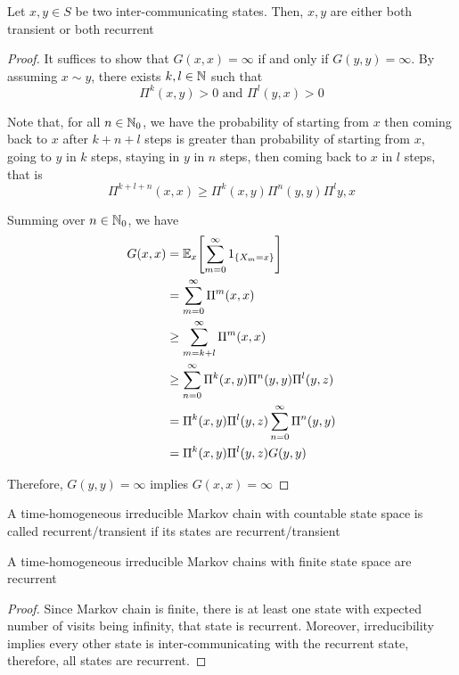 \documentclass{report}
\begin{document}
\begin{proposition}
    Let $x, y \in S$ be two inter-communicating states. Then, $x, y$ are either both transient or both recurrent
\begin{proof}
    It suffices to show that $G(x,x) = \infty$ if and only if $G(y,y) = \infty$. By assuming $x \sim y$, there exists $k, l \in \mathbb{N}$ such that
    $$
        \Pi^k(x, y) > 0 \text{ and } \Pi^l(y, x) > 0
    $$

    Note that, for all $n \in \mathbb{N}_0$, we have the probability of starting from $x$ then coming back to $x$ after $k+n+l$ steps is greater than probability of starting from $x$, going to $y$ in $k$ steps, staying in $y$ in $n$ steps, then coming back to $x$ in $l$ steps, that is
    $$
        \Pi^{k+l+n}(x,x) \geq \Pi^k(x,y) \Pi^n(y,y) \Pi^l{y,x}
    $$

    Summing over $n \in \mathbb{N}_0$, we have
    \begin{align*}
        G(x,x)
        &= \Exp_x\bracket*{\sum_{m=0}^\infty 1_{\set{X_m = x}}} \\
        &= \sum_{m=0}^\infty \Pi^m(x,x) \\
        &\geq \sum_{m=k+l}^\infty \Pi^m(x,x) \\
        &\geq \sum_{n=0}^\infty \Pi^k(x,y) \Pi^n(y,y) \Pi^l(y,z) \\
        &= \Pi^k(x,y) \Pi^l(y,z) \sum_{n=0}^\infty \Pi^n(y,y) \\
        &= \Pi^k(x,y) \Pi^l(y,z) G(y,y) \\
    \end{align*}

    Therefore, $G(y,y) = \infty$ implies $G(x,x) = \infty$
\end{proof}
\end{proposition}

\begin{definition}
    A time-homogeneous irreducible Markov chain with countable state space is called recurrent/transient if its states are recurrent/transient
\end{definition}

\begin{corollary}
    A time-homogeneous irreducible Markov chains with finite state space are recurrent
\begin{proof}
    Since Markov chain is finite, there is at least one state with expected number of visits being infinity, that state is recurrent. Moreover, irreducibility implies every other state is inter-communicating with the recurrent state, therefore, all states are recurrent.
\end{proof}
\end{corollary}
\end{document}

